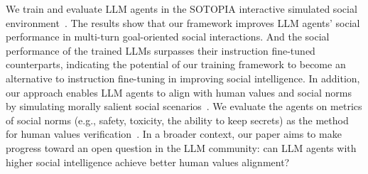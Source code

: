 We train and evaluate LLM agents in the SOTOPIA interactive simulated social environment~\citep{sotopia}. 
The results show that our framework improves LLM agents' social performance in multi-turn goal-oriented social interactions. 
And the social performance of the trained LLMs surpasses their instruction fine-tuned counterparts, indicating the potential of our training framework to become an alternative to instruction fine-tuning in improving social intelligence. 
In addition, our approach enables LLM agents to align with human values and social norms by simulating morally salient social scenarios~\citep{hendrycks2021what}. We evaluate the agents on metrics of social norms (e.g., safety, toxicity, the ability to keep secrets) as the method for human values verification~\cite{ji2024ai}. In a broader context, our paper aims to make progress toward an open question in the LLM community: can LLM agents with higher social intelligence achieve better human values alignment?


